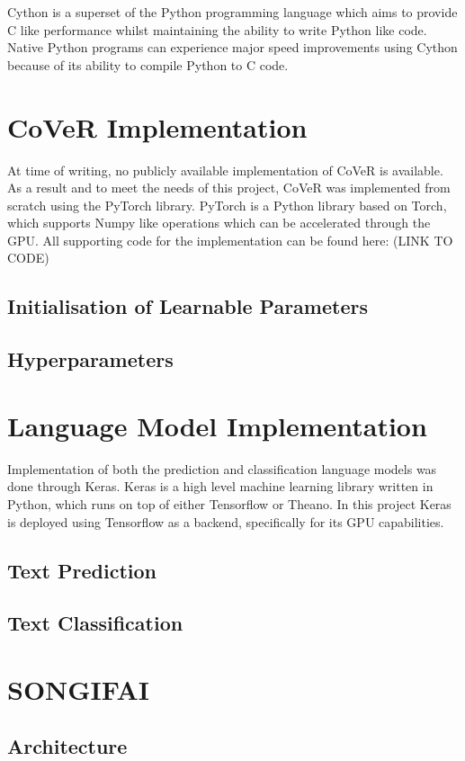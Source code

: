 \noindent
\newline
Cython is a superset of the Python programming language which aims to provide C like performance whilst maintaining the ability to write Python like code. Native Python programs can experience major speed improvements using Cython because of its ability to compile Python to C code. 

\section{CoVeR Implementation}
At time of writing, no publicly available implementation of CoVeR is available. As a result and to meet the needs of this project, CoVeR was implemented from scratch using the PyTorch library. PyTorch is a Python library based on Torch, which supports Numpy like operations which can be accelerated through the GPU. All supporting code for the implementation can be found here: (LINK TO CODE)
\subsection{Initialisation of Learnable Parameters} 
\subsection{Hyperparameters}

\section{Language Model Implementation}
Implementation of both the prediction and classification language models was done through Keras. Keras is a high level machine learning library written in Python, which runs on top of either Tensorflow or Theano. In this project Keras is deployed using Tensorflow as a backend, specifically for its GPU capabilities.
\subsection{Text Prediction}
\subsection{Text Classification}
\section{SONGIFAI}
\subsection{Architecture}
